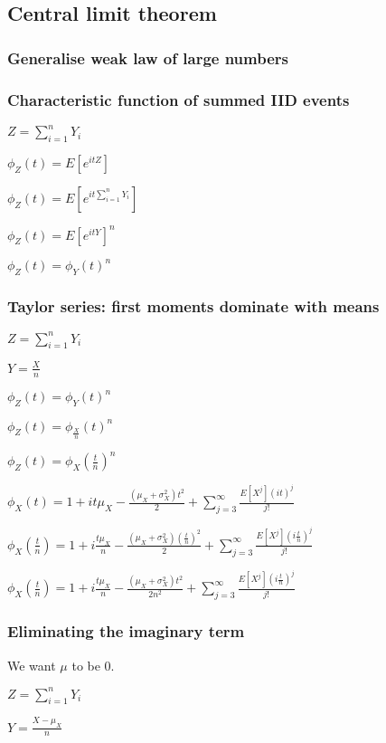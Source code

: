 
\subsection{Central limit theorem}

\subsubsection{Generalise weak law of large numbers}

\subsubsection{Characteristic function of summed IID events}

$Z=\sum_{i=1}^nY_i$

$\phi_Z(t)=E[e^{itZ}]$

$\phi_Z(t)=E[e^{it\sum_{i=1}^nY_i}]$

$\phi_Z(t)=E[e^{itY}]^n$

$\phi_Z(t)=\phi_Y(t)^n$

\subsubsection{Taylor series: first moments dominate with means}

$Z=\sum_{i=1}^nY_i$

$Y=\frac{X}{n}$

$\phi_Z(t)=\phi_Y(t)^n$

$\phi_Z(t)=\phi_{\frac{X}{n}}(t)^n$

$\phi_Z(t)=\phi_X(\frac{t}{n})^n$

$\phi_X(t)=1+it\mu_X -\frac{(\mu_X +\sigma_X^2 )t^2}{2} +\sum_{j=3}^{\infty }\frac{E[X^j](it)^j}{j!}$

$\phi_X(\frac{t}{n})=1+i\frac{t\mu_X }{n}-\frac{(\mu_X +\sigma_X^2 )(\frac{t}{n})^2}{2} +\sum_{j=3}^{\infty }\frac{E[X^j](i\frac{t}{n})^j}{j!}$

$\phi_X(\frac{t}{n})=1+i\frac{t\mu_X }{n}-\frac{(\mu_X +\sigma_X^2 )t^2}{2n^2} +\sum_{j=3}^{\infty }\frac{E[X^j](i\frac{t}{n})^j}{j!}$

\subsubsection{Eliminating the imaginary term}

We want \(\mu \) to be \(0\).

$Z=\sum_{i=1}^nY_i$

$Y=\frac{X-\mu_X }{n}$

